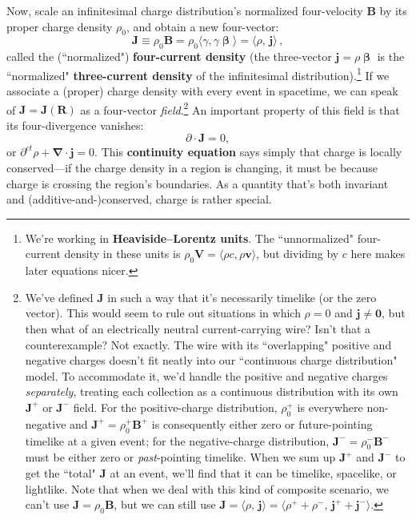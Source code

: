 \documentclass[12pt]{article}
\renewcommand{\vv}[1]{\mathbf{#1}}
\newcommand{\vvbeta}{\bm{\upbeta}}
\newcommand{\del}{\boldsymbol{\nabla}}
\begin{document}
Now, scale an infinitesimal charge distribution's normalized four-velocity $\vv B$ by its proper charge density $\rho_0$, and obtain a new four-vector:
\begin{equation}\label{eq:fc}
\boxed{ \vv J \equiv \rho_0 \vv B = \rho_0 \langle \gamma , \gamma \vvbeta \rangle = \langle \rho, \, \vv j \rangle } \, ,
\end{equation}
called the (``normalized") \textbf{four-current density} (the three-vector $\vv j = \rho \vvbeta$ is the ``normalized" \textbf{three-current density} of the infinitesimal distribution).\footnote{We're working in \textbf{Heaviside--Lorentz units}. The ``unnormalized" four-current density in these units is $\rho_0 \vv V = \langle \rho c, \rho \vv v \rangle$, but dividing by $c$ here makes later equations nicer.} If we associate a (proper) charge density with every event in spacetime, we can speak of $\vv J = \vv J (\vv R)$ as a four-vector \emph{field}.\footnote{We've defined $\vv J$ in such a way that it's necessarily timelike (or the zero vector). This would seem to rule out situations in which $\rho = 0$ and $\vv j \neq \vv 0$, but then what of an electrically neutral current-carrying wire? Isn't that a counterexample? Not exactly. The wire with its ``overlapping" positive and negative charges doesn't fit neatly into our ``continuous charge distribution" model. To accommodate it, we'd handle the positive and negative charges \emph{separately}, treating each collection as a continuous distribution with its own $\vv J^+$ or $\vv J^-$ field. For the positive-charge distribution, $\rho_0^+$ is everywhere non-negative and $\vv J^+ = \rho_0^+ \vv B^+$ is consequently either zero or future-pointing timelike at a given event; for the negative-charge distribution, $\vv J^- = \rho_0^- \vv B^-$ must be either zero or \emph{past}-pointing timelike. When we sum up $\vv J^+$ and $\vv J^-$ to get the ``total" $\vv J$ at an event, we'll find that it can be timelike, spacelike, or lightlike. Note that when we deal with this kind of composite scenario, we can't use $\vv J = \rho_0 \vv B$, but we can still use $\vv J = \langle \rho, \, \vv j \rangle = \langle \rho^+ + \rho^- , \, \vv j^+ + \vv j^- \rangle $.} An important property of this field is that its four-divergence vanishes:
\begin{equation}\label{eq:con}
{\partialup \cdot \vv J = 0} ,
\end{equation}
or $\partial^{ct} \rho + \del \cdot \vv j = 0$. This \textbf{continuity equation} says simply that charge is locally conserved---if the charge density in a region is changing, it must be because charge is crossing the region's boundaries. As a quantity that's both invariant and (additive-and-)conserved, charge is rather special.
\end{document}
